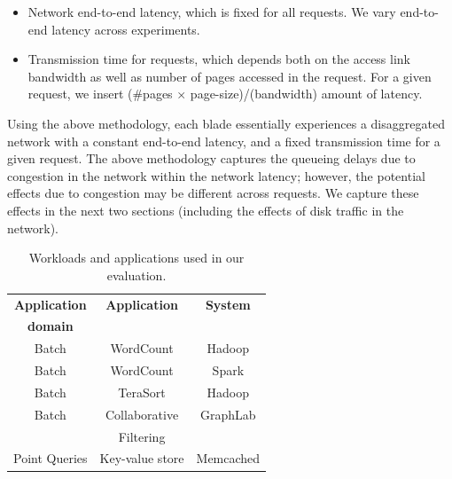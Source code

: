 \begin{itemize}[leftmargin=*]
	\itemsep0em
	\item Network end-to-end latency, which is fixed for all requests. We vary end-to-end latency across experiments.
	\item Transmission time for requests, which depends both on the access link bandwidth as well as number of pages accessed in the request. For a given request, we insert (\#pages $\times$ page-size)/(bandwidth) amount of latency.
\end{itemize}

\noindent
Using the above methodology, each blade essentially experiences a disaggregated network with a constant end-to-end latency, and a fixed transmission time for a given request. The above methodology captures the queueing delays due to congestion in the network within the network latency; however, the potential effects due to congestion may be different across requests. We capture these effects in the next two sections (including the effects of disk traffic in the network).


%
\begin{table}
	\centering
	\caption{\small{Workloads and applications used in our evaluation. }}
	\label{tab:workloads}
	\vspace{0.1in}
  \begin{tabular}{c|c|c}
	  \hline
		\textbf{Application} & \textbf{Application} & \textbf{System}\\
		\textbf{domain} & \textbf{} & \textbf{}\\\hline \hline
    Batch & WordCount & Hadoop\\\hline
    Batch & WordCount & Spark\\\hline
    Batch & TeraSort & Hadoop\\\hline
    Batch & Collaborative & GraphLab\\
     & Filtering & \\\hline
    Point Queries & Key-value store & Memcached\\\hline
    \hline
\end{tabular}
\end{table}


